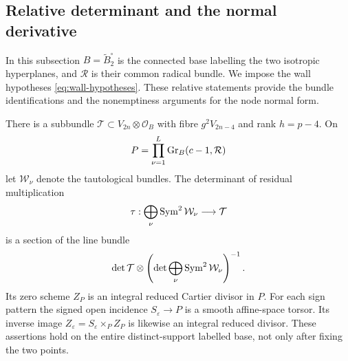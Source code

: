 \subsection{Relative determinant and the normal derivative}
\label{sec:relative-wall-proofs}
In this subsection $B=\widetilde B_2^\circ$ is the connected base
labelling the two isotropic hyperplanes, and $\mathcal R$ is their
common radical bundle. We impose the wall hypotheses
\eqref{eq:wall-hypotheses}. These relative statements provide the
bundle identifications and the nonemptiness arguments for the node
normal form.

\begin{proposition}
\label{prop:relative-residual-divisor}
There is a subbundle $\mathcal T\subset V_{2n}\otimes\mathcal O_B$
with fibre $g^2V_{2n-4}$ and rank $h=p-4$. On
\[
 P=\prod_{\nu=1}^L\operatorname{Gr}_B(c-1,\mathcal R)
\]
let $\mathcal W_\nu$ denote the tautological bundles. The determinant
of residual multiplication
\[
 \tau:\bigoplus_\nu\operatorname{Sym}^2\mathcal W_\nu\longrightarrow\mathcal T
\]
is a section of the line bundle
\begin{equation}\label{eq:relative-determinant-line}
 \det\mathcal T\otimes
 \left(\det\bigoplus_\nu\operatorname{Sym}^2\mathcal W_\nu\right)^{-1}.
\end{equation}
Its zero scheme $Z_P$ is an integral reduced Cartier divisor in $P$.
For each sign pattern the signed open incidence $S_\varepsilon\to P$
is a smooth affine-space torsor. Its inverse image
$Z_\varepsilon=S_\varepsilon\times_P Z_P$ is likewise an integral
reduced divisor. These assertions hold on the entire distinct-support
labelled base, not only after fixing the two points.
\end{proposition}
